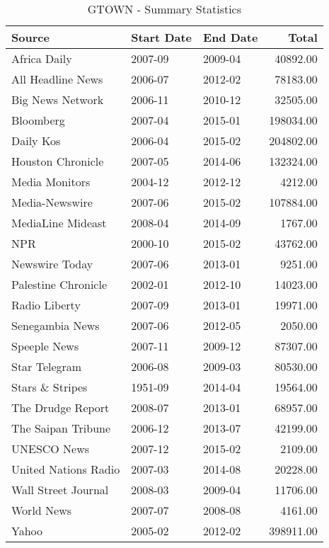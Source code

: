 \begin{table}[ht]
\centering
\caption{GTOWN - Summary Statistics} 
\label{tab:gtown_summary}
\begin{tabular}{lllr}
  \hline
Source & Start Date & End Date & Total \\ 
  \hline
Africa Daily & 2007-09 & 2009-04 & 40892.00 \\ 
  All Headline News & 2006-07 & 2012-02 & 78183.00 \\ 
  Big News Network & 2006-11 & 2010-12 & 32505.00 \\ 
  Bloomberg & 2007-04 & 2015-01 & 198034.00 \\ 
  Daily Kos & 2006-04 & 2015-02 & 204802.00 \\ 
  Houston Chronicle & 2007-05 & 2014-06 & 132324.00 \\ 
  Media Monitors & 2004-12 & 2012-12 & 4212.00 \\ 
  Media-Newswire & 2007-06 & 2015-02 & 107884.00 \\ 
  MediaLine Mideast & 2008-04 & 2014-09 & 1767.00 \\ 
  NPR & 2000-10 & 2015-02 & 43762.00 \\ 
  Newswire Today & 2007-06 & 2013-01 & 9251.00 \\ 
  Palestine Chronicle & 2002-01 & 2012-10 & 14023.00 \\ 
  Radio Liberty & 2007-09 & 2013-01 & 19971.00 \\ 
  Senegambia News & 2007-06 & 2012-05 & 2050.00 \\ 
  Speeple News & 2007-11 & 2009-12 & 87307.00 \\ 
  Star Telegram & 2006-08 & 2009-03 & 80530.00 \\ 
  Stars \& Stripes & 1951-09 & 2014-04 & 19564.00 \\ 
  The Drudge Report & 2008-07 & 2013-01 & 68957.00 \\ 
  The Saipan Tribune & 2006-12 & 2013-07 & 42199.00 \\ 
  UNESCO News & 2007-12 & 2015-02 & 2109.00 \\ 
  United Nations Radio & 2007-03 & 2014-08 & 20228.00 \\ 
  Wall Street Journal & 2008-03 & 2009-04 & 11706.00 \\ 
  World News & 2007-07 & 2008-08 & 4161.00 \\ 
  Yahoo & 2005-02 & 2012-02 & 398911.00 \\ 
   \hline
\end{tabular}
\end{table}
